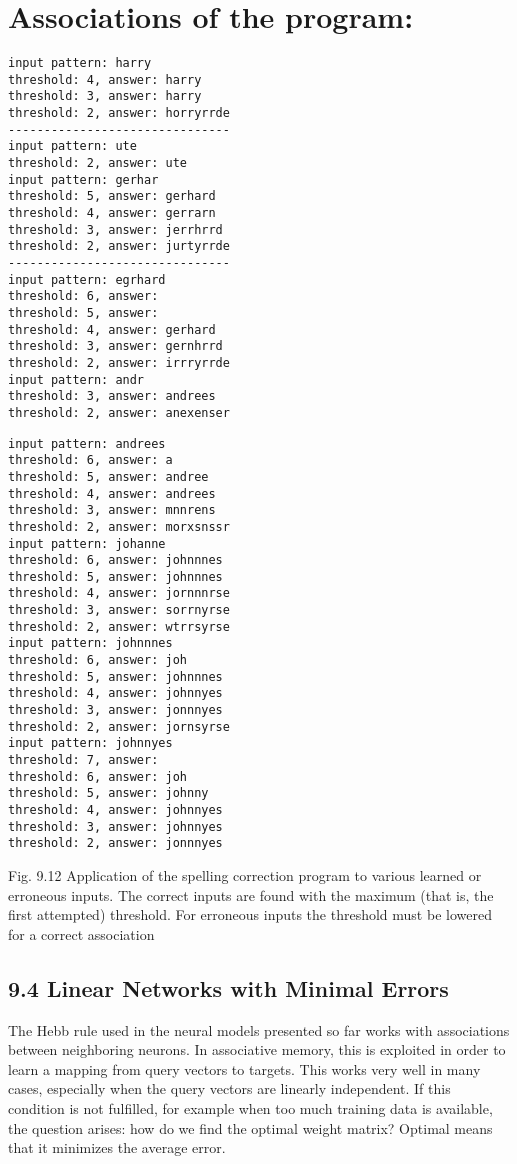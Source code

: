 \documentclass[10pt]{article}
\begin{document}
\section*{Associations of the program:}
\begin{verbatim}
input pattern: harry
threshold: 4, answer: harry
threshold: 3, answer: harry
threshold: 2, answer: horryrrde
-------------------------------
input pattern: ute
threshold: 2, answer: ute
input pattern: gerhar
threshold: 5, answer: gerhard
threshold: 4, answer: gerrarn
threshold: 3, answer: jerrhrrd
threshold: 2, answer: jurtyrrde
-------------------------------
input pattern: egrhard
threshold: 6, answer:
threshold: 5, answer:
threshold: 4, answer: gerhard
threshold: 3, answer: gernhrrd
threshold: 2, answer: irrryrrde
input pattern: andr
threshold: 3, answer: andrees
threshold: 2, answer: anexenser
\end{verbatim}

\begin{verbatim}
input pattern: andrees
threshold: 6, answer: a
threshold: 5, answer: andree
threshold: 4, answer: andrees
threshold: 3, answer: mnnrens
threshold: 2, answer: morxsnssr
input pattern: johanne
threshold: 6, answer: johnnnes
threshold: 5, answer: johnnnes
threshold: 4, answer: jornnnrse
threshold: 3, answer: sorrnyrse
threshold: 2, answer: wtrrsyrse
input pattern: johnnnes
threshold: 6, answer: joh
threshold: 5, answer: johnnnes
threshold: 4, answer: johnnyes
threshold: 3, answer: jonnnyes
threshold: 2, answer: jornsyrse
input pattern: johnnyes
threshold: 7, answer:
threshold: 6, answer: joh
threshold: 5, answer: johnny
threshold: 4, answer: johnnyes
threshold: 3, answer: johnnyes
threshold: 2, answer: jonnnyes
\end{verbatim}

Fig. 9.12 Application of the spelling correction program to various learned or erroneous inputs. The correct inputs are found with the maximum (that is, the first attempted) threshold. For erroneous inputs the threshold must be lowered for a correct association

\subsection*{9.4 Linear Networks with Minimal Errors}
The Hebb rule used in the neural models presented so far works with associations between neighboring neurons. In associative memory, this is exploited in order to learn a mapping from query vectors to targets. This works very well in many cases, especially when the query vectors are linearly independent. If this condition is not fulfilled, for example when too much training data is available, the question arises: how do we find the optimal weight matrix? Optimal means that it minimizes the average error.
\end{document}
